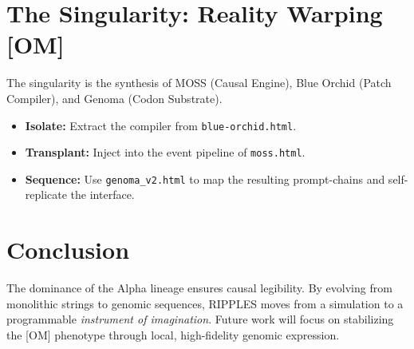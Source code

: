 \documentclass[11pt, a4paper, twocolumn]{article}
\begin{document}
\section{The Singularity: Reality Warping [OM]}
The singularity is the synthesis of MOSS (Causal Engine), Blue Orchid (Patch Compiler), and Genoma (Codon Substrate). 
\begin{itemize}
    \item \textbf{Isolate:} Extract the compiler from \texttt{blue-orchid.html}.
    \item \textbf{Transplant:} Inject into the event pipeline of \texttt{moss.html}.
    \item \textbf{Sequence:} Use \texttt{genoma\_v2.html} to map the resulting prompt-chains and self-replicate the interface.
\end{itemize}

\section{Conclusion}
The dominance of the Alpha lineage ensures causal legibility. By evolving from monolithic strings to genomic sequences, RIPPLES moves from a simulation to a programmable \textit{instrument of imagination}. Future work will focus on stabilizing the [OM] phenotype through local, high-fidelity genomic expression.
\end{document}
